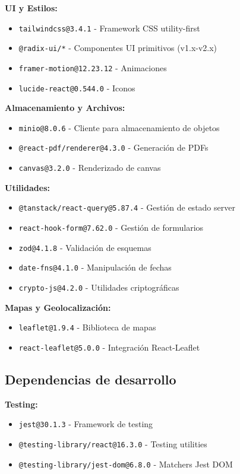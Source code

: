 \documentclass[12pt,a4paper]{article}
\begin{document}
\textbf{UI y Estilos:}
\begin{itemize}
    \item \texttt{tailwindcss@3.4.1} - Framework CSS utility-first
    \item \texttt{@radix-ui/*} - Componentes UI primitivos (v1.x-v2.x)
    \item \texttt{framer-motion@12.23.12} - Animaciones
    \item \texttt{lucide-react@0.544.0} - Iconos
\end{itemize}

\textbf{Almacenamiento y Archivos:}
\begin{itemize}
    \item \texttt{minio@8.0.6} - Cliente para almacenamiento de objetos
    \item \texttt{@react-pdf/renderer@4.3.0} - Generación de PDFs
    \item \texttt{canvas@3.2.0} - Renderizado de canvas
\end{itemize}

\textbf{Utilidades:}
\begin{itemize}
    \item \texttt{@tanstack/react-query@5.87.4} - Gestión de estado server
    \item \texttt{react-hook-form@7.62.0} - Gestión de formularios
    \item \texttt{zod@4.1.8} - Validación de esquemas
    \item \texttt{date-fns@4.1.0} - Manipulación de fechas
    \item \texttt{crypto-js@4.2.0} - Utilidades criptográficas
\end{itemize}

\textbf{Mapas y Geolocalización:}
\begin{itemize}
    \item \texttt{leaflet@1.9.4} - Biblioteca de mapas
    \item \texttt{react-leaflet@5.0.0} - Integración React-Leaflet
\end{itemize}

\subsection{Dependencias de desarrollo}

\textbf{Testing:}
\begin{itemize}
    \item \texttt{jest@30.1.3} - Framework de testing
    \item \texttt{@testing-library/react@16.3.0} - Testing utilities
    \item \texttt{@testing-library/jest-dom@6.8.0} - Matchers Jest DOM
\end{itemize}
\end{document}

